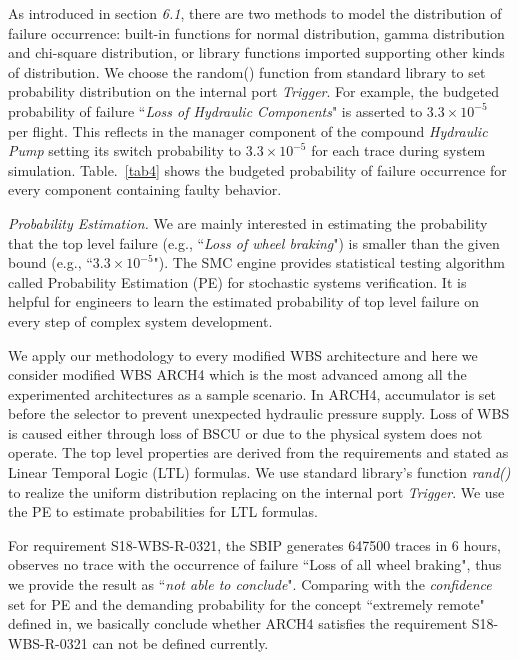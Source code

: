 As introduced in section \emph{6.1}, there are two methods to model the distribution of failure occurrence: built-in functions for normal distribution, gamma distribution and chi-square distribution, or library functions imported supporting other kinds of distribution. We choose the random() function from standard library to set probability distribution on the internal port \emph{Trigger}. For example, the budgeted probability of failure ``\emph{Loss of Hydraulic Components}" is asserted to $3.3\times10^{-5}$ per flight. This reflects in the manager component of the compound \emph{Hydraulic Pump} setting its switch probability to $3.3\times10^{-5}$ for each trace during system simulation. Table.~\ref{tab4} shows the budgeted probability of failure occurrence for every component containing faulty behavior.

\emph{Probability Estimation.}
We are mainly interested in estimating the probability that the top level failure (e.g., ``\emph{Loss of wheel braking}") is smaller than the given bound (e.g., ``$3.3\times10^{-5}$"). The SMC engine provides statistical testing algorithm called Probability Estimation (PE)\cite{vmcai04} for stochastic systems verification. It is helpful for engineers to learn the estimated probability of top level failure on every step of complex system development.

We apply our methodology to every modified WBS architecture and here we consider modified WBS ARCH4 which is the most advanced among all the experimented architectures as a sample scenario.
In ARCH4, accumulator is set before the selector to prevent unexpected hydraulic pressure supply. Loss of WBS is caused either through loss of BSCU or due to the physical system does not operate. The top level properties are derived from the requirements and stated as Linear Temporal Logic (LTL) formulas. We use standard library's function \emph{rand()} to realize the uniform distribution\cite{uniform} replacing on the internal port \emph{Trigger}. We use the PE to estimate probabilities for LTL formulas. 

For requirement S18-WBS-R-0321, the SBIP generates 647500 traces in 6 hours, observes no trace with the occurrence of failure ``Loss of all wheel braking", thus we provide the result as ``\emph{not able to conclude}". Comparing with the \emph{confidence} set for PE and the demanding probability for the concept ``extremely remote" defined in\cite{ac}, we basically conclude whether ARCH4 satisfies the requirement S18-WBS-R-0321 can not be defined currently.

